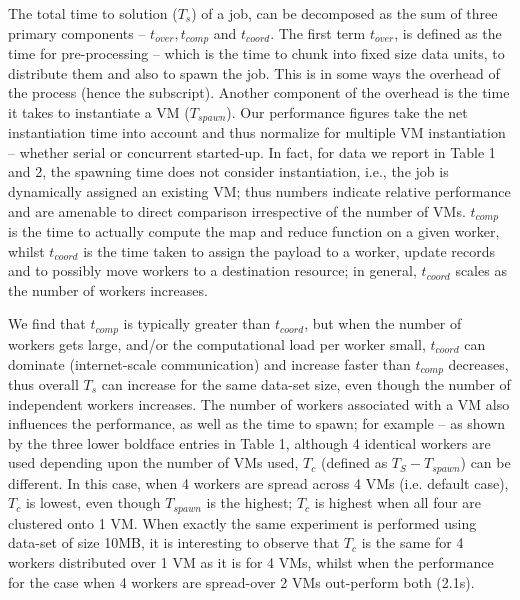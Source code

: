 \documentclass[3p,twocolumn]{elsarticle}
\begin{document}
The total time to solution ($T_s$) of a \sagamapreduce job, can be
decomposed as the sum of three primary components -- $t_{over},
t_{comp}$ and $t_{coord}$.  The first term $t_{over}$, is defined as
the time for pre-processing -- which is the time to chunk into fixed
size data units, to distribute them and also to spawn the job. This is
in some ways the overhead of the process (hence the subscript).
Another component of the overhead is the time it takes to instantiate
a VM ($T_{spawn}$).
Our performance figures take the net instantiation time into account
and thus normalize for multiple VM instantiation -- whether serial or
concurrent started-up. In fact, for data we report in Table 1 and 2,
the spawning time does not consider instantiation, i.e., the job is
dynamically assigned an existing VM; thus numbers indicate relative
performance and are amenable to direct comparison irrespective of the
number of VMs.  $t_{comp}$ is the time to actually compute the map and
reduce function on a given worker, whilst $t_{coord}$ is the time
taken to assign the payload to a worker, update records and to
possibly move workers to a destination resource; in general,
$t_{coord}$ scales as the number of workers increases.

We find that $t_{comp}$ is typically greater than $t_{coord}$, but
when the number of workers gets large, and/or the computational load
per worker small, $t_{coord}$ can dominate (internet-scale
communication) and increase faster than $t_{comp}$ decreases, thus
overall $T_s$ can increase for the same data-set size, even though the
number of independent workers increases.  The number of workers
associated with a VM also influences the performance, as well as the
time to spawn; for example -- as shown by the three lower boldface
entries in Table 1, although 4 identical workers are used depending
upon the number of VMs used, $T_c$ (defined as $T_S - T_{spawn} $) can
be different.  In this case, when 4 workers are spread across 4 VMs
(i.e. default case), $T_c$ is lowest, even though $T_{spawn}$ is the
highest; $T_c$ is highest when all four are clustered onto 1 VM. When
exactly the same experiment is performed using data-set of size 10MB,
it is interesting to observe that $T_c$ is the same for 4 workers
distributed over 1 VM as it is for 4 VMs, whilst when the performance
for the case when  4 workers are spread-over 2 VMs out-perform both (2.1s).
\end{document}
